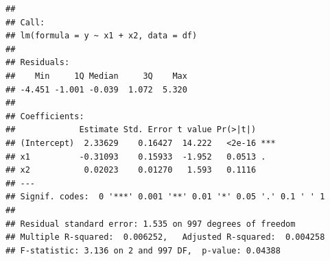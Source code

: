 \documentclass[
]{book}
\newenvironment{Shaded}{\begin{snugshade}}{\end{snugshade}}
\newcommand{\CommentTok}[1]{\textcolor[rgb]{0.56,0.35,0.01}{\textit{#1}}}
\newcommand{\DataTypeTok}[1]{\textcolor[rgb]{0.13,0.29,0.53}{#1}}
\newcommand{\DecValTok}[1]{\textcolor[rgb]{0.00,0.00,0.81}{#1}}
\newcommand{\FloatTok}[1]{\textcolor[rgb]{0.00,0.00,0.81}{#1}}
\newcommand{\KeywordTok}[1]{\textcolor[rgb]{0.13,0.29,0.53}{\textbf{#1}}}
\newcommand{\NormalTok}[1]{#1}
\newcommand{\OperatorTok}[1]{\textcolor[rgb]{0.81,0.36,0.00}{\textbf{#1}}}
\newcommand{\StringTok}[1]{\textcolor[rgb]{0.31,0.60,0.02}{#1}}
\begin{document}
\begin{Shaded}
\end{Shaded}

\begin{verbatim}
## 
## Call:
## lm(formula = y ~ x1 + x2, data = df)
## 
## Residuals:
##    Min     1Q Median     3Q    Max 
## -4.451 -1.001 -0.039  1.072  5.320 
## 
## Coefficients:
##             Estimate Std. Error t value Pr(>|t|)    
## (Intercept)  2.33629    0.16427  14.222   <2e-16 ***
## x1          -0.31093    0.15933  -1.952   0.0513 .  
## x2           0.02023    0.01270   1.593   0.1116    
## ---
## Signif. codes:  0 '***' 0.001 '**' 0.01 '*' 0.05 '.' 0.1 ' ' 1
## 
## Residual standard error: 1.535 on 997 degrees of freedom
## Multiple R-squared:  0.006252,	Adjusted R-squared:  0.004258 
## F-statistic: 3.136 on 2 and 997 DF,  p-value: 0.04388
\end{verbatim}
\end{document}

